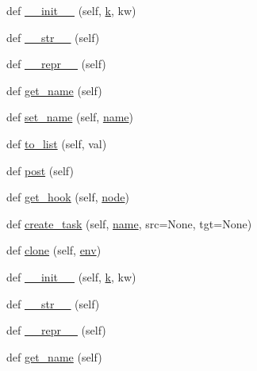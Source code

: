 \begin{DoxyCompactItemize}
\item 
def \hyperlink{classwaflib_1_1_task_gen_1_1task__gen_a17ba35bed2219481190d515ffef57404}{\+\_\+\+\_\+init\+\_\+\+\_\+} (self, \hyperlink{rfft2d_test_m_l_8m_adc468c70fb574ebd07287b38d0d0676d}{k}, kw)
\item 
def \hyperlink{classwaflib_1_1_task_gen_1_1task__gen_a48c763160308a6ff809b7048702618b1}{\+\_\+\+\_\+str\+\_\+\+\_\+} (self)
\item 
def \hyperlink{classwaflib_1_1_task_gen_1_1task__gen_a040db536e5d7fe5054c9e9da52f36eb0}{\+\_\+\+\_\+repr\+\_\+\+\_\+} (self)
\item 
def \hyperlink{classwaflib_1_1_task_gen_1_1task__gen_a50370e76b549fc3bd0369c35f4fc1bab}{get\+\_\+name} (self)
\item 
def \hyperlink{classwaflib_1_1_task_gen_1_1task__gen_a79705c7a6b9b09021ee549e428c5a5c1}{set\+\_\+name} (self, \hyperlink{lib_2expat_8h_a1b49b495b59f9e73205b69ad1a2965b0}{name})
\item 
def \hyperlink{classwaflib_1_1_task_gen_1_1task__gen_a31a9f508654465cd5fe9f3baaaf77ec4}{to\+\_\+list} (self, val)
\item 
def \hyperlink{classwaflib_1_1_task_gen_1_1task__gen_aa00dedae17f7fa03c169f0e4bdab7414}{post} (self)
\item 
def \hyperlink{classwaflib_1_1_task_gen_1_1task__gen_a19b53157d4411479cf8f55e0ef0edfec}{get\+\_\+hook} (self, \hyperlink{structnode}{node})
\item 
def \hyperlink{classwaflib_1_1_task_gen_1_1task__gen_ad432ecefdf2362d1cccf1dad31fac2d3}{create\+\_\+task} (self, \hyperlink{lib_2expat_8h_a1b49b495b59f9e73205b69ad1a2965b0}{name}, src=None, tgt=None)
\item 
def \hyperlink{classwaflib_1_1_task_gen_1_1task__gen_a7b7e036b797a0532ce6be8df951ba048}{clone} (self, \hyperlink{classwaflib_1_1_task_gen_1_1task__gen_a4d6f968ce8718fdf77d46ea3b56def1e}{env})
\item 
def \hyperlink{classwaflib_1_1_task_gen_1_1task__gen_a17ba35bed2219481190d515ffef57404}{\+\_\+\+\_\+init\+\_\+\+\_\+} (self, \hyperlink{rfft2d_test_m_l_8m_adc468c70fb574ebd07287b38d0d0676d}{k}, kw)
\item 
def \hyperlink{classwaflib_1_1_task_gen_1_1task__gen_a48c763160308a6ff809b7048702618b1}{\+\_\+\+\_\+str\+\_\+\+\_\+} (self)
\item 
def \hyperlink{classwaflib_1_1_task_gen_1_1task__gen_a040db536e5d7fe5054c9e9da52f36eb0}{\+\_\+\+\_\+repr\+\_\+\+\_\+} (self)
\item 
def \hyperlink{classwaflib_1_1_task_gen_1_1task__gen_a50370e76b549fc3bd0369c35f4fc1bab}{get\+\_\+name} (self)

\end{DoxyCompactItemize}
